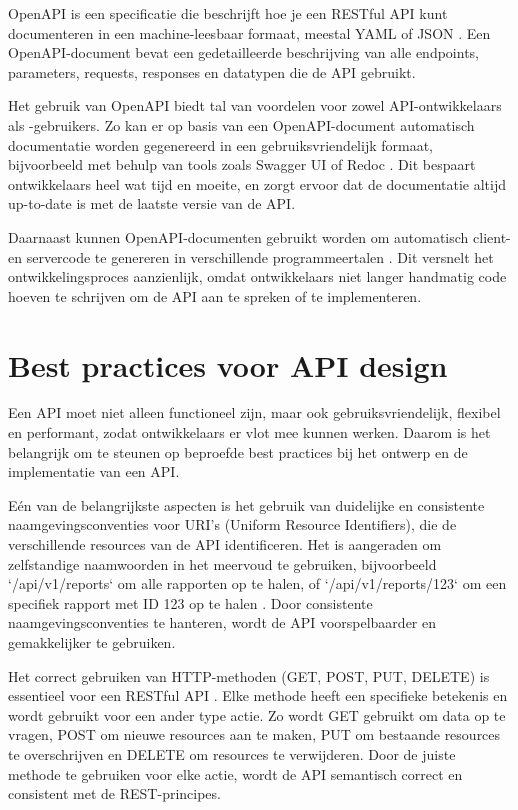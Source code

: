 \bigskip

OpenAPI is een specificatie die beschrijft hoe je een RESTful API kunt documenteren in een machine-leesbaar formaat, meestal YAML of JSON \autocite{Swagger2021}. Een OpenAPI-document bevat een gedetailleerde beschrijving van alle endpoints, parameters, requests, responses en datatypen die de API gebruikt.

\bigskip

Het gebruik van OpenAPI biedt tal van voordelen voor zowel API-ontwikkelaars als -gebruikers. Zo kan er op basis van een OpenAPI-document automatisch documentatie worden gegenereerd in een gebruiksvriendelijk formaat, bijvoorbeeld met behulp van tools zoals Swagger UI of Redoc \autocite{Swagger2021}. Dit bespaart ontwikkelaars heel wat tijd en moeite, en zorgt ervoor dat de documentatie altijd up-to-date is met de laatste versie van de API.

\bigskip

Daarnaast kunnen OpenAPI-documenten gebruikt worden om automatisch client- en servercode te genereren in verschillende programmeertalen \autocite{Swagger2021}. Dit versnelt het ontwikkelingsproces aanzienlijk, omdat ontwikkelaars niet langer handmatig code hoeven te schrijven om de API aan te spreken of te implementeren.

\section{Best practices voor API design}

Een API moet niet alleen functioneel zijn, maar ook gebruiksvriendelijk, flexibel en performant, zodat ontwikkelaars er vlot mee kunnen werken. Daarom is het belangrijk om te steunen op beproefde best practices bij het ontwerp en de implementatie van een API.

\bigskip

Eén van de belangrijkste aspecten is het gebruik van duidelijke en consistente naamgevingsconventies voor URI's (Uniform Resource Identifiers), die de verschillende resources van de API identificeren. Het is aangeraden om zelfstandige naamwoorden in het meervoud te gebruiken, bijvoorbeeld `/api/v1/reports` om alle rapporten op te halen, of `/api/v1/reports/123` om een specifiek rapport met ID 123 op te halen \autocite{Lange2024}. Door consistente naamgevingsconventies te hanteren, wordt de API voorspelbaarder en gemakkelijker te gebruiken.

\bigskip

Het correct gebruiken van HTTP-methoden (GET, POST, PUT, DELETE) is essentieel voor een RESTful API \autocite{Lange2024}. Elke methode heeft een specifieke betekenis en wordt gebruikt voor een ander type actie. Zo wordt GET gebruikt om data op te vragen, POST om nieuwe resources aan te maken, PUT om bestaande resources te overschrijven en DELETE om resources te verwijderen. Door de juiste methode te gebruiken voor elke actie, wordt de API semantisch correct en consistent met de REST-principes.

